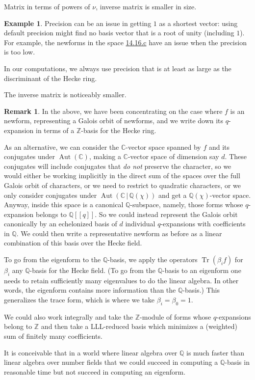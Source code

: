 \documentclass[11pt]{amsart}
\numberwithin{equation}{subsection}
\theoremstyle{plain}
\theoremstyle{definition}
\newtheorem{rmk}[equation]{Remark}
\newtheorem{exm}[equation]{Example}
\newcommand{\Q}{\mathbb{Q}}
\newcommand{\Z}{\mathbb{Z}}
\newcommand{\C}{\mathbb{C}}
\DeclareMathOperator{\Aut}{Aut}
\DeclareMathOperator{\Tr}{Tr}
\begin{document}
Matrix in terms of powers of $\nu$, inverse matrix is smaller in size.

\begin{exm}
Precision can be an issue in getting $1$ as a shortest vector: using default precision might find no basis vector that is a root of unity (including $1$).  For example, the newforms in the space \href{http://cmfs.lmfdb.xyz/ModularForm/GL2/Q/holomorphic/14/16/c/}{\textsf{14.16.c}} have an issue when the precision is too low.  

In our computations, we always use precision that is at least as large as the discriminant of the Hecke ring.  
\end{exm}

The inverse matrix is noticeably smaller.  

\begin{rmk}
In the above, we have been concentrating on the case where $f$ is an newform, representing a Galois orbit of newforms, and we write down its $q$-expansion in terms of a $\Z$-basis for the Hecke ring.  

As an alternative, we can consider the $\C$-vector space spanned by $f$ and its conjugates under $\Aut(\C)$, making a $\C$-vector space of dimension say $d$.  These conjugates will include conjugates that \emph{do not} preserve the character, so we would either be working implicitly in the direct sum of the spaces over the full Galois orbit of characters, or we need to restrict to quadratic characters, or we only consider conjugates under $\Aut(\C\,|\,\Q(\chi))$ and get a $\Q(\chi)$-vector space.  Anyway, inside this space is a canonical $\Q$-subspace, namely, those forms whose $q$-expansion belongs to $\Q[[q]]$.  So we could instead represent the Galois orbit canonically by an echelonized basis of $d$ individual $q$-expansions with coefficients in $\Q$.  We could then write a representative newform as before as a linear combination of this basis over the Hecke field.

To go from the eigenform to the $\Q$-basis, we apply the operators $\Tr(\beta_i f)$ for $\beta_i$ any $\Q$-basis for the Hecke field.  (To go from the $\Q$-basis to an eigenform one needs to retain sufficiently many eigenvalues to do the linear algebra.  In other words, the eigenform contains more information than the $\Q$-basis.)  This generalizes the trace form, which is where we take $\beta_i=\beta_0=1$.  

We could also work integrally and take the $\Z$-module of forms whose $q$-expansions belong to $\Z$ and then take a LLL-reduced basis which minimizes a (weighted) sum of finitely many coefficients.  

It is conceivable that in a world where linear algebra over $\Q$ is much faster than linear algebra over number fields that we could succeed in computing a $\Q$-basis in reasonable time but not succeed in computing an eigenform.  
\end{rmk}
\end{document}
